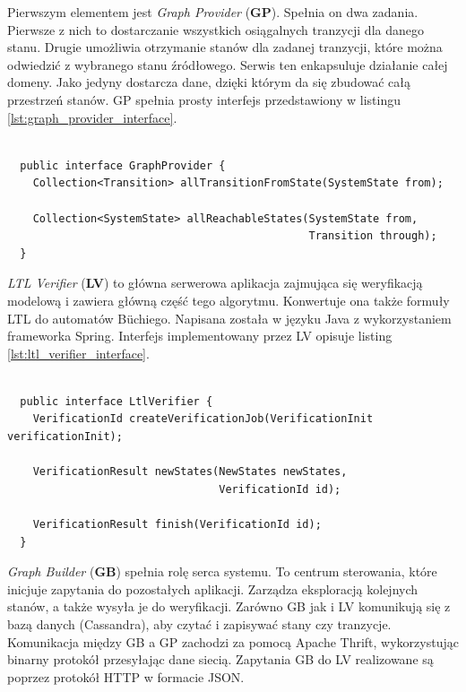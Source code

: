 Pierwszym elementem jest \textit{Graph Provider} (\textbf{GP}).
Spełnia on dwa zadania.
Pierwsze z nich to dostarczanie wszystkich osiągalnych tranzycji dla danego stanu.
Drugie umożliwia otrzymanie stanów dla zadanej tranzycji, które można odwiedzić z wybranego stanu źródłowego.
Serwis ten enkapsuluje działanie całej domeny.
Jako jedyny dostarcza dane, dzięki którym da się zbudować całą przestrzeń stanów.
GP spełnia prosty interfejs przedstawiony w listingu \ref{lst:graph_provider_interface}.

\begin{minipage}{\linewidth}
\begin{lstlisting}[caption={Interfejs implementowany przez GP.},captionpos=b,label={lst:graph_provider_interface}]

  public interface GraphProvider {
    Collection<Transition> allTransitionFromState(SystemState from);

    Collection<SystemState> allReachableStates(SystemState from,
                                               Transition through);
  }
\end{lstlisting}
\end{minipage}

\textit{LTL Verifier} (\textbf{LV}) to główna serwerowa aplikacja zajmująca się weryfikacją modelową i zawiera główną część tego algorytmu.
Konwertuje ona także formuły LTL do automatów Büchiego.
Napisana została w języku Java z wykorzystaniem frameworka Spring.
Interfejs implementowany przez LV opisuje listing \ref{lst:ltl_verifier_interface}.

\begin{lstlisting}[caption={Interfejs implementowany przez LV.},captionpos=b,label={lst:ltl_verifier_interface}]

  public interface LtlVerifier {
    VerificationId createVerificationJob(VerificationInit verificationInit);

    VerificationResult newStates(NewStates newStates,
                                 VerificationId id);

    VerificationResult finish(VerificationId id);
  }
\end{lstlisting}

\textit{Graph Builder} (\textbf{GB}) spełnia rolę serca systemu.
To centrum sterowania, które inicjuje zapytania do pozostałych aplikacji.
Zarządza eksploracją kolejnych stanów, a także wysyła je do weryfikacji.
Zarówno GB jak i LV komunikują się z bazą danych (Cassandra), aby czytać i zapisywać stany czy tranzycje.
Komunikacja między GB a GP zachodzi za pomocą Apache Thrift, wykorzystując binarny protokół przesyłając dane siecią.
Zapytania GB do LV realizowane są poprzez protokół HTTP w formacie JSON.

